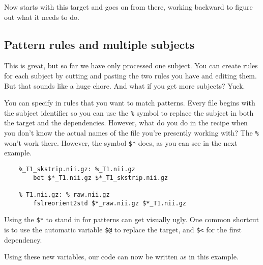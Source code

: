 Now \maken{} starts with this target and goes on from there, working backward to figure out what it needs to do.

\subsection{Pattern rules and multiple subjects}

This is great, but so far we have only processed one subject. You can
create rules for each subject by cutting and pasting the two rules you
have and editing them. But that sounds like a huge chore. And what if
you get more subjects? Yuck.

You can specify in rules that you want to match patterns. Every file
begins with the subject identifier so you can use the \texttt{\%}
symbol to replace the subject in both the target and the
dependencies. However, what do you do in the
recipe when you don't know the actual names of the file you're
presently working with? The \texttt{\%} won't work there. However, the
symbol \texttt{\$*} does, as you can see in the next example.

%	

\begin{lstlisting}
	%_T1_skstrip.nii.gz: %_T1.nii.gz
		bet $*_T1.nii.gz $*_T1_skstrip.nii.gz
		
	%_T1.nii.gz: %_raw.nii.gz
		fslreorient2std $*_raw.nii.gz $*_T1.nii.gz
\end{lstlisting}

Using the \texttt{\$*} to stand in for patterns can get visually ugly. One common
shortcut is to use the automatic variable \texttt{\$@} to replace the
target, and \texttt{\$<} for the first dependency.


Using these new variables, our code can now be written as in this example.
%	

